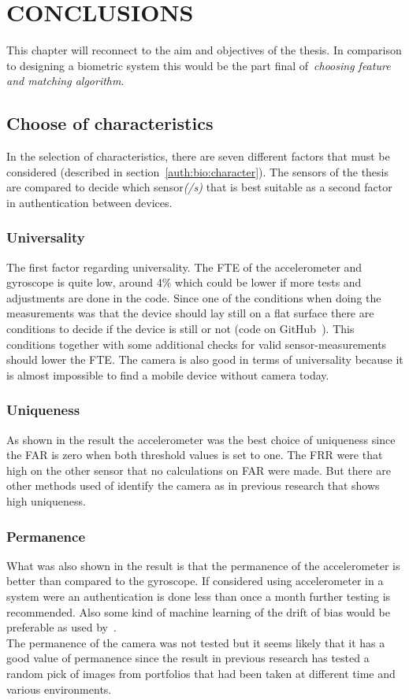 \chapter{CONCLUSIONS}\label{cha:conculsions}
This chapter will reconnect to the aim and objectives of the thesis. In comparison to designing a biometric system this would be the part final of~\textit{choosing feature and matching algorithm}.

\section{Choose of characteristics}\label{sec:concl:choose}
In the selection of characteristics, there are seven different factors that must be considered (described in section~\ref{auth:bio:character}). The sensors of the thesis are compared to decide which sensor\textit{(/s)} that is best suitable as a second factor in authentication between devices.

\subsection*{Universality}
The first factor regarding universality. The FTE of the accelerometer and gyroscope is quite low, around 4\% which could be lower if more tests and adjustments are done in the code. Since one of the conditions when doing the measurements was that the device should lay still on a flat surface there are conditions to decide if the device is still or not (code on GitHub~\cite[]{sensorrec}). This conditions together with some additional checks for valid sensor-measurements should lower the FTE.  The camera is also good in terms of universality because it is almost impossible to find a mobile device without camera today.\\

\subsection*{Uniqueness}
As shown in the result the accelerometer was the best choice of uniqueness since the FAR is zero when both threshold values is set to one. The FRR were that high on the other sensor that no calculations on FAR were made. But there are other methods used of identify the camera as in previous research that shows high uniqueness.~\cite[]{sensor:camera:blind}

\subsection*{Permanence}
What was also shown in the result is that the permanence of the accelerometer is better than compared to the gyroscope. If considered using accelerometer in a system were an authentication is done less than once a month further testing is recommended. Also some kind of machine learning of the drift of bias would be preferable as used by~\cite[]{sensor:accelPrint}. \\
The permanence of the camera was not tested but it seems likely that it has a good value of permanence since the result in previous research has tested a random pick of images from portfolios that had been taken at different time and various environments.~\cite[]{sensor:camera:DCIdent}

